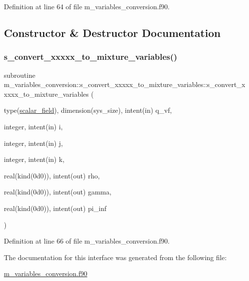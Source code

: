 Definition at line 64 of file m\+\_\+variables\+\_\+conversion.\+f90.



\subsection{Constructor \& Destructor Documentation}
\mbox{\label{interfacem__variables__conversion_1_1s__convert__xxxxx__to__mixture__variables_a603ed4c3b600fb1f4e9a0c1bc2574573}} 
\subsubsection{\texorpdfstring{s\+\_\+convert\+\_\+xxxxx\+\_\+to\+\_\+mixture\+\_\+variables()}{s\_convert\_xxxxx\_to\_mixture\_variables()}}
{\footnotesize\ttfamily subroutine m\+\_\+variables\+\_\+conversion\+::s\+\_\+convert\+\_\+xxxxx\+\_\+to\+\_\+mixture\+\_\+variables\+::s\+\_\+convert\+\_\+xxxxx\+\_\+to\+\_\+mixture\+\_\+variables (\begin{DoxyParamCaption}\item[{type(\hyperlink{structm__derived__types_1_1scalar__field}{scalar\+\_\+field}), dimension(sys\+\_\+size), intent(in)}]{q\+\_\+vf,  }\item[{integer, intent(in)}]{i,  }\item[{integer, intent(in)}]{j,  }\item[{integer, intent(in)}]{k,  }\item[{real(kind(0d0)), intent(out)}]{rho,  }\item[{real(kind(0d0)), intent(out)}]{gamma,  }\item[{real(kind(0d0)), intent(out)}]{pi\+\_\+inf }\end{DoxyParamCaption})}



Definition at line 66 of file m\+\_\+variables\+\_\+conversion.\+f90.



The documentation for this interface was generated from the following file\+:\begin{DoxyCompactItemize}
\item 
\hyperlink{m__variables__conversion_8f90}{m\+\_\+variables\+\_\+conversion.\+f90}\end{DoxyCompactItemize}
